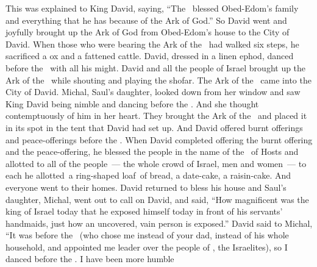 \begin{inparaenum}
   This was explained to King David, saying, ``The \lord\ blessed Obed-Edom's family and everything that he has because of the Ark of God.'' So David went and joyfully brought up the Ark of God from Obed-Edom's house to the City of David.%
   When those who were bearing the Ark of the \lord\ had walked six steps, he sacrificed a ox and a fattened cattle.%
   David, dressed in a linen ephod, danced before the \lord\ with all his might.%
   David and all the people of Israel brought up the Ark of the \lord\ while shouting and playing the shofar.%
   The Ark of the \lord\ came into the City of David. Michal, Saul's daughter, looked down from her window and saw King David being nimble and dancing before the \lord. And she thought contemptuously of him in her heart.%
   They brought the Ark of the \lord\ and placed it in its spot in the tent that David had set up. And David offered burnt offerings and peace-offerings before the \lord.%
   When David completed offering the burnt offering and the peace-offering, he blessed the people in the name of the \lord\ of Hosts%
   and allotted to all of the people~--- the whole crowd of Israel, men and women~--- to each he allotted\understood\ a ring-shaped loaf\understood\ of bread, a date-cake, a raisin-cake. And everyone went to their homes.%
   David returned to bless his house and Saul's daughter, Michal, went out to call on David, and said, ``How magnificent was the king of Israel today that he exposed himself today in front of his servants' handmaids, just how an uncovered, vain person is exposed.''%
   David said to Michal, ``It was before the \lord\ (who chose me instead of your dad, instead of his whole household, and appointed me leader over the people of \god, the Israelites), so I danced before the \lord.%
   I have been more humble
\end{inparaenum}
